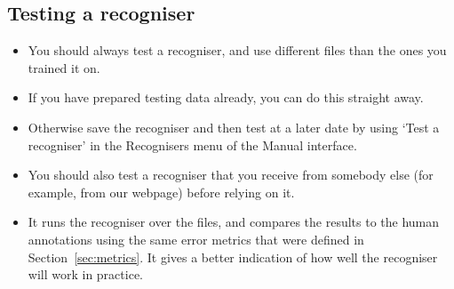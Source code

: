 \documentclass{article}
\begin{document}
\subsection{Testing a recogniser}\label{sec:testfilter}

\begin{itemize}
\item You should always test a recogniser, and use different files than the ones you trained it on.
\item If you have prepared testing data already, you can do this straight away. 
\item Otherwise save the recogniser and then test at a later date by using `Test a recogniser' in the Recognisers menu of the Manual interface.
\item You should also test a recogniser that you receive from somebody else (for example, from our webpage) before relying on it.
\item It runs the recogniser over the files, and compares the results to the human annotations using the same error metrics that were defined in Section~\ref{sec:metrics}. It gives a better indication of how well the recogniser will work in practice. %
\end{itemize}
\end{document}
